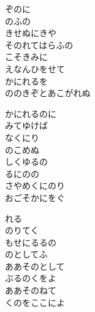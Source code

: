 \documentclass[10pt,b5j]{tarticle} %
\begin{document}
\vspace{1.5em} %
\newcommand{\linespace}{0.5em} %
\newcommand{\blocksize}{0.5\hsize} %
\begin{enumerate} %
    \begin{minipage}[c]{\blocksize}
    
        \vspace{\linespace}
        \item
        ぞのに\\
        のふの\\
        きせぬにきや\\
        そのれてはらふの\\
        こそきみに\\
        えなんひをせて\\
        かにれるを\\
        ののきぞとあこがれぬ
        
        \vspace{\linespace}
        \item
        かにれるのに\\
        みてゆけば\\
        なくにり\\
        のこめぬ\\
        しくゆるの\\
        るにのの\\
        さやめくにのり\\
        おごそかにをぐ
        
        \vspace{\linespace}
        \item
        れる\\
        のりてく\\
        もせにるるの\\
        のとしてふ\\
        ああそのとして\\
        ぶるのくをよ\\
        ああそのねて\\
        くのをここによ
        

\end{minipage}
\end{enumerate}
\end{document}
